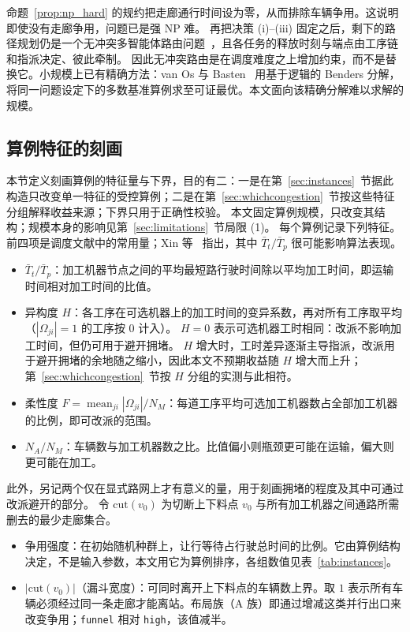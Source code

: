 \documentclass[manuscript,screen,review]{acmart}
\begin{document}
命题~\ref{prop:np_hard} 的规约把走廊通行时间设为零，从而排除车辆争用。这说明即使没有走廊争用，问题已是强 NP 难。
再把决策 (i)--(iii) 固定之后，剩下的路径规划仍是一个无冲突多智能体路由问题~\cite{gao2023mapf}，且各任务的释放时刻与端点由工序链和指派决定、彼此牵制。
因此无冲突路由是在调度难度之上增加约束，而不是替换它。小规模上已有精确方法：van Os 与 Basten~\cite{vanos2026exact} 用基于逻辑的 Benders 分解，
将同一问题设定下的多数基准算例求至可证最优。本文面向该精确分解难以求解的规模。

\subsection{算例特征的刻画}
\label{sec:features}

本节定义刻画算例的特征量与下界，目的有二：一是在第~\ref{sec:instances}~节据此构造只改变单一特征的受控算例；二是在第~\ref{sec:whichcongestion}~节按这些特征分组解释收益来源；下界只用于正确性校验。
本文固定算例规模，只改变其结构；规模本身的影响见第~\ref{sec:limitations}~节局限 (1)。
每个算例记录下列特征。前四项是调度文献中的常用量；Xin 等~\cite{xin2025review} 指出，其中 $\bar{T}_t/\bar{T}_p$ 很可能影响算法表现。


\begin{itemize}[leftmargin=*,topsep=2pt,itemsep=1pt]
  \item $\bar{T}_t/\bar{T}_p$：加工机器节点之间的平均最短路行驶时间除以平均加工时间，即运输时间相对加工时间的比值。
  \item 异构度 $H$：各工序在可选机器上的加工时间的变异系数，再对所有工序取平均（$|\Omega_{ji}|=1$ 的工序按 $0$ 计入）。
  $H=0$ 表示可选机器工时相同：改派不影响加工时间，但仍可用于避开拥堵。
  $H$ 增大时，工时差异逐渐主导指派，改派用于避开拥堵的余地随之缩小，因此本文不预期收益随 $H$ 增大而上升；第~\ref{sec:whichcongestion}~节按 $H$ 分组的实测与此相符。
  \item 柔性度 $F=\operatorname{mean}_{ji}|\Omega_{ji}|/N_M$：每道工序平均可选加工机器数占全部加工机器的比例，即可改派的范围。
  \item $N_A/N_M$：车辆数与加工机器数之比。比值偏小则瓶颈更可能在运输，偏大则更可能在加工。
\end{itemize}

此外，另记两个仅在显式路网上才有意义的量，用于刻画拥堵的程度及其中可通过改派避开的部分。
令 $\mathrm{cut}(v_0)$ 为切断上下料点 $v_0$ 与所有加工机器之间通路所需删去的最少走廊集合。

\begin{itemize}[leftmargin=*,topsep=2pt,itemsep=1pt]
  \item 争用强度：在初始随机种群上，让行等待占行驶总时间的比例。它由算例结构决定，不是输入参数，本文用它为算例排序，各组数值见表~\ref{tab:instances}。
  \item $|\mathrm{cut}(v_0)|$（漏斗宽度）：可同时离开上下料点的车辆数上界。取 $1$ 表示所有车辆必须经过同一条走廊才能离站。布局族（A 族）即通过增减这类并行出口来改变争用；\texttt{funnel} 相对 \texttt{high}，该值减半。
\end{itemize}
\end{document}
